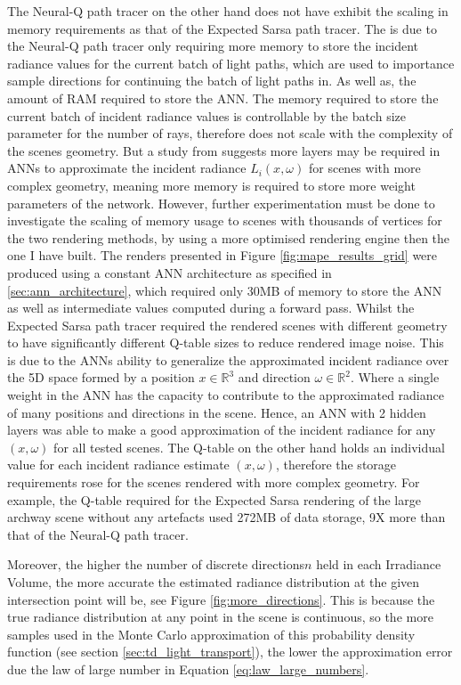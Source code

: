 \documentclass[../dissertation.tex]{subfiles}
\begin{document}
The Neural-Q path tracer on the other hand does not have exhibit the scaling in memory requirements as that of the Expected Sarsa path tracer. The is due to the Neural-Q path tracer only requiring more memory to store the incident radiance values for the current batch of light paths, which are used to importance sample directions for continuing the batch of light paths in. As well as, the amount of RAM required to store the ANN. The memory required to store the current batch of incident radiance values is controllable by the batch size parameter for the number of rays, therefore does not scale with the complexity of the scenes geometry. But a study from \cite{ren2013global} suggests more layers may be required in ANNs to approximate the incident radiance $L_i(x, \omega)$ for scenes with more complex geometry, meaning more memory is required to store more weight parameters of the network. However, further experimentation must be done to investigate the scaling of memory usage to scenes with thousands of vertices for the two rendering methods, by using a more optimised rendering engine then the one I have built. The renders presented in Figure \ref{fig:mape_results_grid} were produced using a constant ANN architecture as specified in \ref{sec:ann_architecture}, which required only 30MB of memory to store the ANN as well as intermediate values computed during a forward pass. Whilst the Expected Sarsa path tracer required the rendered scenes with different geometry to have significantly different Q-table sizes to reduce rendered image noise. This is due to the ANNs ability to generalize the approximated incident radiance over the 5D space formed by a position $x \in \mathbb{R}^3$ and direction $\omega \in \mathbb{R}^2$. Where a single weight in the ANN has the capacity to contribute to the approximated radiance of many positions and directions in the scene. Hence, an ANN with 2 hidden layers was able to make a good approximation of the incident radiance for any $(x, \omega)$ for all tested scenes. The Q-table on the other hand holds an individual value for each incident radiance estimate $(x,\omega)$, therefore the storage requirements rose for the scenes rendered with more complex geometry. For example, the Q-table required for the Expected Sarsa rendering of the large archway scene without any artefacts used 272MB of data storage, 9X more than that of the Neural-Q path tracer.


Moreover, the higher the number of discrete directions$n$ held in each Irradiance Volume, the more accurate the estimated radiance distribution at the given intersection point will be, see Figure \ref{fig:more_directions}. This is because the true radiance distribution at any point in the scene is continuous, so the more samples used in the Monte Carlo approximation of this probability density function (see section \ref{sec:td_light_transport}), the lower the approximation error due the law of large number in Equation \ref{eq:law_large_numbers}. 
\end{document}
